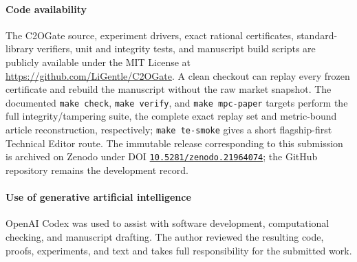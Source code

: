 \documentclass[smallextended]{svjour3}
\begin{document}
\paragraph{Code availability}
The C2OGate source, experiment drivers, exact rational certificates,
standard-library verifiers, unit and integrity tests, and manuscript build
scripts are publicly available under the MIT License at
\url{https://github.com/LiGentle/C2OGate}.  A clean checkout can replay every
frozen certificate and rebuild the manuscript without the raw market
snapshot.  The documented \texttt{make check}, \texttt{make verify}, and
\texttt{make mpc-paper} targets perform the full integrity/tampering suite,
the complete exact replay set and metric-bound article reconstruction,
respectively; \texttt{make te-smoke} gives a short flagship-first Technical
Editor route.  The immutable release corresponding to this submission is
archived on Zenodo under DOI
\href{https://doi.org/10.5281/zenodo.21964074}{\nolinkurl{10.5281/zenodo.21964074}}; the
GitHub repository remains the development record.

\paragraph{Use of generative artificial intelligence}
OpenAI Codex was used to assist with software development, computational
checking, and manuscript drafting.  The author reviewed the resulting code,
proofs, experiments, and text and takes full responsibility for the submitted
work.
\end{document}
